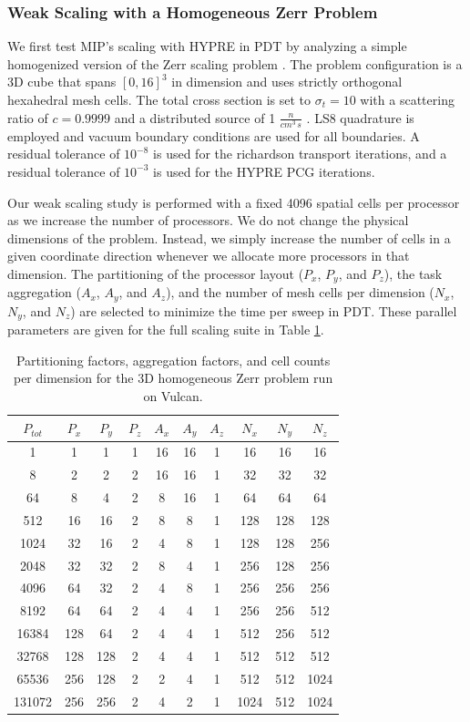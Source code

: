 \subsubsection{Weak Scaling with a Homogeneous Zerr Problem}
\label{sec::DSA_Results_Scaling_Zerr}

We first test MIP's scaling with HYPRE in PDT by analyzing a simple homogenized version of the Zerr scaling problem \cite{zerr2011solution}. The problem configuration is a 3D cube that spans $[0,16]^3$ in dimension and uses strictly orthogonal hexahedral mesh cells. The total cross section is set to $\sigma_t=10$ with a scattering ratio of $c=0.9999$ and a distributed source of 1 $\frac{n}{cm^3 \, s}$ . LS8 quadrature is employed and vacuum boundary conditions are used for all boundaries. A residual tolerance of $10^{-8}$ is used for the richardson transport iterations, and a residual tolerance of $10^{-3}$ is used for the HYPRE PCG iterations.

Our weak scaling study is performed with a fixed 4096 spatial cells per processor as we increase the number of processors. We do not change the physical dimensions of the problem. Instead, we simply increase the number of cells in a given coordinate direction whenever we allocate more processors in that dimension. The partitioning of the processor layout ($P_x$, $P_y$, and $P_z$), the task aggregation ($A_x$, $A_y$, and $A_z$), and the number of mesh cells per dimension ($N_x$, $N_y$, and $N_z$) are selected to minimize the time per sweep in PDT. These parallel parameters are given for the full scaling suite in Table \ref{tab::DSA_Vulcan_agg_part}.

\begin{table}[h]
\centering
\caption{Partitioning factors, aggregation factors, and cell counts per dimension for the 3D homogeneous Zerr problem run on Vulcan.}
\begin{tabular}{|c|c|c|c|c|c|c|c|c|c|}
\hline
$P_{tot}$&$P_{x}$&$P_{y}$&$P_{z}$&$A_{x}$&$A_{y}$&$A_{z}$ &$N_{x}$&$N_{y}$&$N_{z}$ \\
\hline \hline
1&1&1&1&16&16&1& 16&16&16 \\
8&2&2&2&16&16&1&32&32&32\\
64&8&4&2&8&16&1&64&64&64\\
512&16&16&	2&	8&	8&	1&	128&	128&	128\\
1024&	32&16&2&4&8&	1&	128&	128&	256\\
2048&	32&32&2&8&4&	1&	256&	128&	256\\
4096&	64&32&2&4&8&	1&	256&	256&	256\\
8192&	64&64&2&4&4&	1&	256&	256&	512\\
16384&128&	64&2&4&	4&	1&	512&	256&	512\\
32768&128&	128&2&4&	4&	1&	512&	512&	512\\
65536&256&	128&2&2&	4&	1&	512&	512&	1024\\
131072&256&256&2&	4&	2&	1&	1024&	512&	1024\\
\hline
\end{tabular}
\label{tab::DSA_Vulcan_agg_part}
\end{table}

